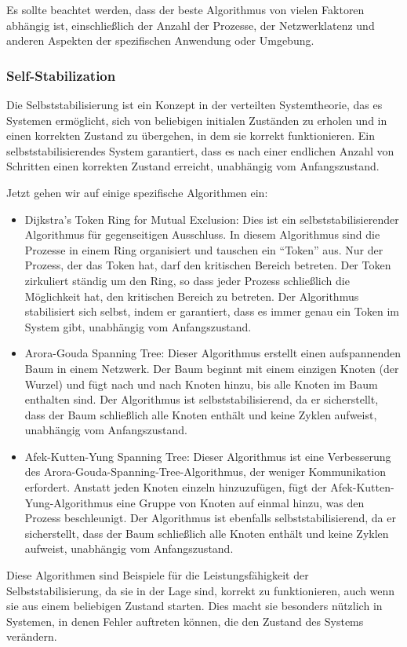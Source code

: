 Es sollte beachtet werden, dass der beste Algorithmus von vielen Faktoren abhängig ist, einschließlich der Anzahl der Prozesse, der Netzwerklatenz und anderen Aspekten der spezifischen Anwendung oder Umgebung.

\subsubsection{Self-Stabilization}
Die Selbststabilisierung ist ein Konzept in der verteilten Systemtheorie, das es Systemen ermöglicht, sich von beliebigen initialen Zuständen zu erholen und in einen korrekten Zustand zu übergehen, in dem sie korrekt funktionieren. Ein selbststabilisierendes System garantiert, dass es nach einer endlichen Anzahl von Schritten einen korrekten Zustand erreicht, unabhängig vom Anfangszustand.

Jetzt gehen wir auf einige spezifische Algorithmen ein:
\begin{itemize}
\item Dijkstra's Token Ring for Mutual Exclusion: Dies ist ein selbststabilisierender Algorithmus für gegenseitigen Ausschluss. In diesem Algorithmus sind die Prozesse in einem Ring organisiert und tauschen ein \enquote{Token} aus. Nur der Prozess, der das Token hat, darf den kritischen Bereich betreten. Der Token zirkuliert ständig um den Ring, so dass jeder Prozess schließlich die Möglichkeit hat, den kritischen Bereich zu betreten. Der Algorithmus stabilisiert sich selbst, indem er garantiert, dass es immer genau ein Token im System gibt, unabhängig vom Anfangszustand.
\item Arora-Gouda Spanning Tree: Dieser Algorithmus erstellt einen aufspannenden Baum in einem Netzwerk. Der Baum beginnt mit einem einzigen Knoten (der Wurzel) und fügt nach und nach Knoten hinzu, bis alle Knoten im Baum enthalten sind. Der Algorithmus ist selbststabilisierend, da er sicherstellt, dass der Baum schließlich alle Knoten enthält und keine Zyklen aufweist, unabhängig vom Anfangszustand.
\item Afek-Kutten-Yung Spanning Tree: Dieser Algorithmus ist eine Verbesserung des Arora-Gouda-Spanning-Tree-Algorithmus, der weniger Kommunikation erfordert. Anstatt jeden Knoten einzeln hinzuzufügen, fügt der Afek-Kutten-Yung-Algorithmus eine Gruppe von Knoten auf einmal hinzu, was den Prozess beschleunigt. Der Algorithmus ist ebenfalls selbststabilisierend, da er sicherstellt, dass der Baum schließlich alle Knoten enthält und keine Zyklen aufweist, unabhängig vom Anfangszustand.
\end{itemize}
Diese Algorithmen sind Beispiele für die Leistungsfähigkeit der Selbststabilisierung, da sie in der Lage sind, korrekt zu funktionieren, auch wenn sie aus einem beliebigen Zustand starten. Dies macht sie besonders nützlich in Systemen, in denen Fehler auftreten können, die den Zustand des Systems verändern.

